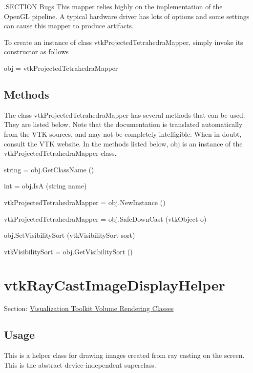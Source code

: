 .S\-E\-C\-T\-I\-O\-N Bugs This mapper relies highly on the implementation of the Open\-G\-L pipeline. A typical hardware driver has lots of options and some settings can cause this mapper to produce artifacts.

To create an instance of class vtk\-Projected\-Tetrahedra\-Mapper, simply invoke its constructor as follows \begin{DoxyVerb}  obj = vtkProjectedTetrahedraMapper
\end{DoxyVerb}
 \hypertarget{vtkwidgets_vtkxyplotwidget_Methods}{}\subsection{Methods}\label{vtkwidgets_vtkxyplotwidget_Methods}
The class vtk\-Projected\-Tetrahedra\-Mapper has several methods that can be used. They are listed below. Note that the documentation is translated automatically from the V\-T\-K sources, and may not be completely intelligible. When in doubt, consult the V\-T\-K website. In the methods listed below, {\ttfamily obj} is an instance of the vtk\-Projected\-Tetrahedra\-Mapper class. 
\begin{DoxyItemize}
\item {\ttfamily string = obj.\-Get\-Class\-Name ()}  
\item {\ttfamily int = obj.\-Is\-A (string name)}  
\item {\ttfamily vtk\-Projected\-Tetrahedra\-Mapper = obj.\-New\-Instance ()}  
\item {\ttfamily vtk\-Projected\-Tetrahedra\-Mapper = obj.\-Safe\-Down\-Cast (vtk\-Object o)}  
\item {\ttfamily obj.\-Set\-Visibility\-Sort (vtk\-Visibility\-Sort sort)}  
\item {\ttfamily vtk\-Visibility\-Sort = obj.\-Get\-Visibility\-Sort ()}  
\end{DoxyItemize}\hypertarget{vtkvolumerendering_vtkraycastimagedisplayhelper}{}\section{vtk\-Ray\-Cast\-Image\-Display\-Helper}\label{vtkvolumerendering_vtkraycastimagedisplayhelper}
Section\-: \hyperlink{sec_vtkvolumerendering}{Visualization Toolkit Volume Rendering Classes} \hypertarget{vtkwidgets_vtkxyplotwidget_Usage}{}\subsection{Usage}\label{vtkwidgets_vtkxyplotwidget_Usage}
This is a helper class for drawing images created from ray casting on the screen. This is the abstract device-\/independent superclass.

